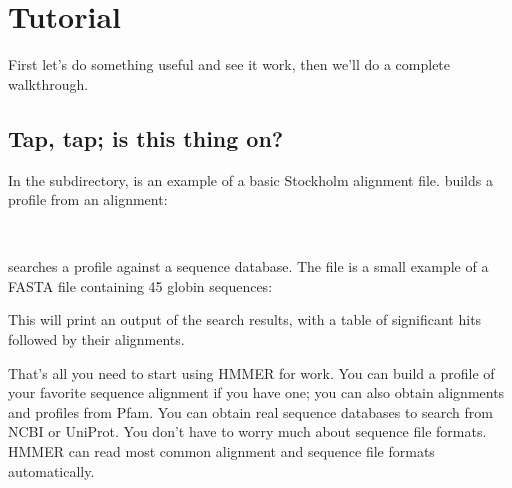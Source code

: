 
\chapter{Tutorial}
\label{chapter:tutorial}
\setcounter{footnote}{0}



First let's do something useful and see it work, then we'll do a
complete walkthrough.

\section{Tap, tap; is this thing on?}

In the  subdirectory,  is an example
of a basic Stockholm alignment file.  builds a profile
from an alignment:

  \vspace{1ex}
   \\
  \vspace{1ex}

 searches a profile against a sequence database.  The
file  is a small example of a FASTA file
containing 45 globin sequences:

  \vspace{1ex}
  \vspace{1ex}
  
This will print an output of the search results, with a table of
significant hits followed by their alignments.

That's all you need to start using HMMER for work. You can build
a profile of your favorite sequence alignment if you have one; you can
also obtain alignments and profiles from
Pfam. You can
obtain real sequence databases to search from
NCBI
or
UniProt.
You don't have to worry much about sequence file formats. HMMER can
read most common alignment and sequence file formats
automatically. 
  
